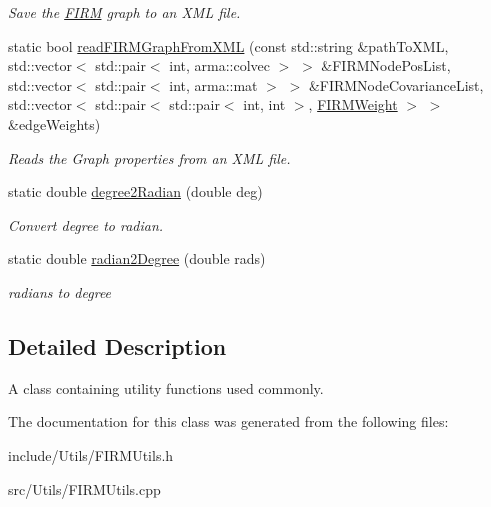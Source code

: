 \begin{DoxyCompactItemize}
\begin{DoxyCompactList}\small\item\em Save the \hyperlink{class_f_i_r_m}{F\-I\-R\-M} graph to an X\-M\-L file. \end{DoxyCompactList}\item 
\hypertarget{class_f_i_r_m_utils_a0c4cb647459fcd8e96755958b3d702fd}{static bool \hyperlink{class_f_i_r_m_utils_a0c4cb647459fcd8e96755958b3d702fd}{read\-F\-I\-R\-M\-Graph\-From\-X\-M\-L} (const std\-::string \&path\-To\-X\-M\-L, std\-::vector$<$ std\-::pair$<$ int, arma\-::colvec $>$ $>$ \&F\-I\-R\-M\-Node\-Pos\-List, std\-::vector$<$ std\-::pair$<$ int, arma\-::mat $>$ $>$ \&F\-I\-R\-M\-Node\-Covariance\-List, std\-::vector$<$ std\-::pair$<$ std\-::pair$<$ int, int $>$, \hyperlink{class_f_i_r_m_weight}{F\-I\-R\-M\-Weight} $>$ $>$ \&edge\-Weights)}\label{class_f_i_r_m_utils_a0c4cb647459fcd8e96755958b3d702fd}

\begin{DoxyCompactList}\small\item\em Reads the Graph properties from an X\-M\-L file. \end{DoxyCompactList}\item 
\hypertarget{class_f_i_r_m_utils_a19b1f1574a8088dc39bc0b0fb7391407}{static double \hyperlink{class_f_i_r_m_utils_a19b1f1574a8088dc39bc0b0fb7391407}{degree2\-Radian} (double deg)}\label{class_f_i_r_m_utils_a19b1f1574a8088dc39bc0b0fb7391407}

\begin{DoxyCompactList}\small\item\em Convert degree to radian. \end{DoxyCompactList}\item 
\hypertarget{class_f_i_r_m_utils_a9e70aee41474db20d312d7e5fde21775}{static double \hyperlink{class_f_i_r_m_utils_a9e70aee41474db20d312d7e5fde21775}{radian2\-Degree} (double rads)}\label{class_f_i_r_m_utils_a9e70aee41474db20d312d7e5fde21775}

\begin{DoxyCompactList}\small\item\em radians to degree \end{DoxyCompactList}\end{DoxyCompactItemize}


\subsection{Detailed Description}
A class containing utility functions used commonly. 

The documentation for this class was generated from the following files\-:\begin{DoxyCompactItemize}
\item 
include/\-Utils/F\-I\-R\-M\-Utils.\-h\item 
src/\-Utils/F\-I\-R\-M\-Utils.\-cpp\end{DoxyCompactItemize}
